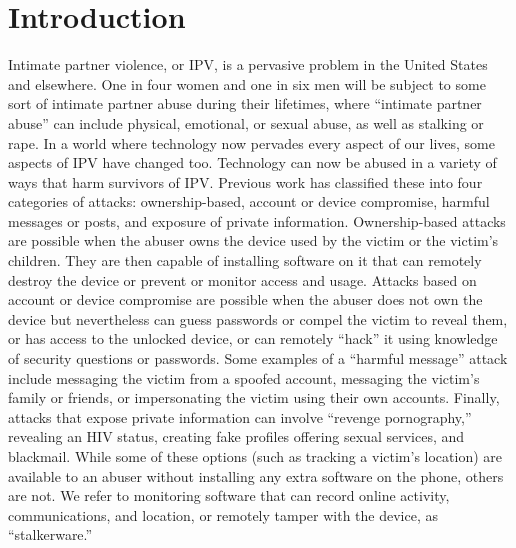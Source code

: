 \documentclass[acmtog]{acmart}
\begin{document}
\maketitle

\section{Introduction}
Intimate partner violence, or IPV, is a pervasive problem in the United States 
and elsewhere. One in four women and one in six men will be subject to some 
sort of intimate 
partner abuse during their lifetimes, where ``intimate partner abuse'' can 
include physical, emotional, or sexual abuse, as well as stalking or rape. In a 
world where technology now pervades every aspect of our lives, some 
aspects of IPV have changed too. Technology can now be abused in a variety of 
ways that harm survivors of IPV. Previous work \cite{ristenpart_ucsd_talk} has 
classified these into four categories of attacks: ownership-based, account or 
device compromise, harmful messages or posts, and exposure of private 
information. Ownership-based attacks are possible when the abuser owns the 
device used by the victim or the victim's children. They are then capable 
of installing software on it that can remotely destroy the device or prevent or 
monitor access and usage. Attacks based on account or device compromise are 
possible when the abuser does not own the device but nevertheless can guess 
passwords or compel the victim to reveal them, or has access to the unlocked 
device, or can remotely ``hack'' it using knowledge of security questions or 
passwords. Some examples of a ``harmful message'' attack include messaging the 
victim from a spoofed account, messaging the victim's family or friends, or 
impersonating the victim using their own accounts. Finally, attacks that expose 
private information can involve ``revenge pornography,'' revealing an HIV 
status, creating fake profiles offering sexual services, and blackmail. While 
some of these options (such as tracking a victim's location) are available to 
an abuser without installing any extra software on the phone, others are not. 
We refer to monitoring software that can record online activity, 
communications, and location, or remotely tamper with the device, as 
``stalkerware.''  
\end{document}
